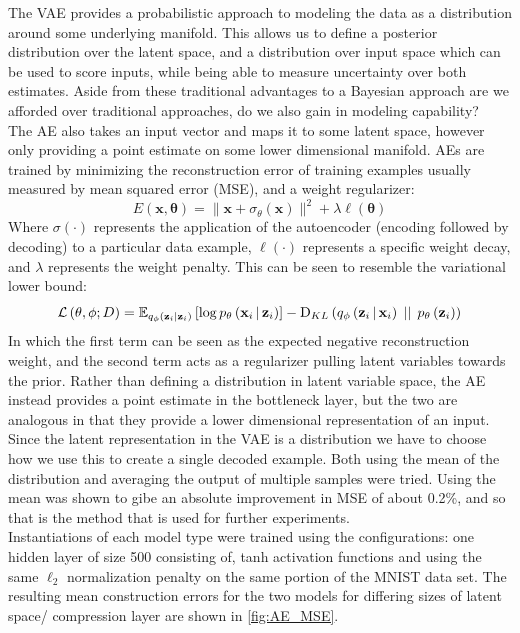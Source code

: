 \documentclass[../report.tex]{subfiles}
\begin{document}
The VAE provides a probabilistic approach to modeling the data as a distribution around some underlying manifold. This allows us to define a posterior distribution over the latent space, and a distribution over input space which can be used to score inputs, while being able to measure uncertainty over both estimates. Aside from these traditional advantages to a Bayesian approach are we afforded over traditional approaches, do we also gain in modeling capability?\\
The AE also takes an input vector and maps it to some latent space, however only providing a point estimate on some lower dimensional manifold. AEs are trained by minimizing the reconstruction error of training examples usually measured by mean squared error (MSE), and a weight regularizer:
\begin{equation}
E(\mathbf{x, \theta}) = \lVert \mathbf{x} + \sigma_\theta(\mathbf{x})\rVert^2 + \lambda \ell(\mathbf{\theta})
\end{equation}
Where $\sigma(\cdot)$ represents the application of the autoencoder (encoding followed by decoding) to a particular data example, $\ell(\cdot)$ represents a specific weight decay, and $\lambda$ represents the weight penalty. This can be seen to resemble the variational lower bound:
$$\mathcal{L} \left( \mathbf{\theta}, \phi; D\right)=\mathbb{E}_{q_\phi \left( \mathbf{z}_i|\mathbf{z}_i\right)} \left[ \log p_\mathbf{\theta} \left(\mathbf{x}_i \, \middle\vert \, \mathbf{z}_i \right) \right] - \textrm{D}_{KL} \left( q_\phi \left(\mathbf{z}_i \, \middle\vert \, \mathbf{x}_i \right) \, \mid \mid \, p_\mathbf{\theta} \left( \mathbf{z}_i\right)\right)$$
In which the first term can be seen as the expected negative reconstruction weight, and the second term acts as a regularizer pulling latent variables towards the prior. Rather than defining a distribution in latent variable space, the AE instead provides a point estimate in the bottleneck layer, but the two are analogous in that they provide a lower dimensional representation of an input.\\
Since the latent representation in the VAE is a distribution we have to choose how we use this to create a single decoded example. Both using the mean of the distribution and averaging the output of multiple samples were tried. Using the mean was shown to gibe an absolute improvement in MSE of about 0.2\%, and so that is the method that is used for further experiments.\\
Instantiations of each model type were trained using the configurations: one hidden layer of size 500 consisting of, tanh activation functions and using the same $\ell_2$ normalization penalty on the same portion of the MNIST data set. The resulting mean construction errors for the two models for differing sizes of latent space/ compression layer are shown in \cref{fig:AE_MSE}.
\end{document}
